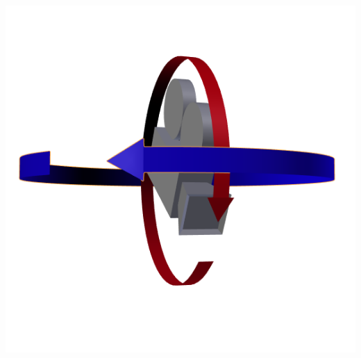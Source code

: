 \documentclass[9pt]{beamer}
\begin{document}
\begin{frame}
\begin{columns}
		\includegraphics[width=\columnwidth]{../results/images/PanTilt.png}
	\end{columns}
\end{frame}
\end{document}
